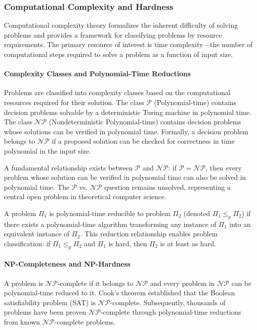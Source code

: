 \subsubsection{Computational Complexity and Hardness}

Computational complexity theory formalizes the inherent difficulty of solving problems and provides a framework for classifying problems by resource requirements. The primary resource of interest is time complexity—the number of computational steps required to solve a problem as a function of input size.

\paragraph{Complexity Classes and Polynomial-Time Reductions}

Problems are classified into complexity classes based on the computational resources required for their solution. The class $\mathcal{P}$ (Polynomial-time) contains decision problems solvable by a deterministic Turing machine in polynomial time. The class $\mathcal{NP}$ (Nondeterministic Polynomial-time) contains decision problems whose solutions can be verified in polynomial time. Formally, a decision problem belongs to $\mathcal{NP}$ if a proposed solution can be checked for correctness in time polynomial in the input size.

A fundamental relationship exists between $\mathcal{P}$ and $\mathcal{NP}$: if $\mathcal{P} = \mathcal{NP}$, then every problem whose solution can be verified in polynomial time can also be solved in polynomial time. The $\mathcal{P}$ vs. $\mathcal{NP}$ question remains unsolved, representing a central open problem in theoretical computer science.

A problem $\Pi_1$ is polynomial-time reducible to problem $\Pi_2$ (denoted $\Pi_1 \leq_p \Pi_2$) if there exists a polynomial-time algorithm transforming any instance of $\Pi_1$ into an equivalent instance of $\Pi_2$. This reduction relationship enables problem classification: if $\Pi_1 \leq_p \Pi_2$ and $\Pi_1$ is hard, then $\Pi_2$ is at least as hard.

\paragraph{NP-Completeness and NP-Hardness}

A problem is $\mathcal{NP}$-complete if it belongs to $\mathcal{NP}$ and every problem in $\mathcal{NP}$ can be polynomial-time reduced to it. Cook's theorem established that the Boolean satisfiability problem (SAT) is $\mathcal{NP}$-complete. Subsequently, thousands of problems have been proven $\mathcal{NP}$-complete through polynomial-time reductions from known $\mathcal{NP}$-complete problems.

